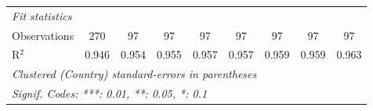 \begin{table}[htbp]
\begin{tabular}{lcccccccc}
      \midrule \emph{Fit statistics}\\
      Observations                            & 270            & 97            & 97          & 97          & 97      & 97            & 97            & 97\\  
      R$^2$                                   & 0.946          & 0.954         & 0.955       & 0.957       & 0.957   & 0.959         & 0.959         & 0.963\\  
      \midrule
      \multicolumn{9}{l}{\emph{Clustered (Country) standard-errors in parentheses}}\\
      \multicolumn{9}{l}{\emph{Signif. Codes: ***: 0.01, **: 0.05, *: 0.1}}\\
   \end{tabular}
\end{table}


